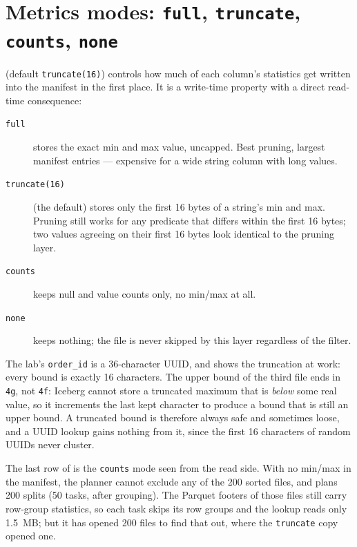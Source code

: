 \section{Metrics modes: \texttt{full}, \texttt{truncate}, \texttt{counts}, \texttt{none}}
\label{sec:ice-read-metrics-modes}

 (default \texttt{truncate(16)})
controls how much of each column's statistics get written into the manifest in
the first place. It is a write-time property with a direct read-time consequence:

\begin{description}
  \item[\texttt{full}] stores the exact min and max value, uncapped. Best
        pruning, largest manifest entries --- expensive for a wide string
        column with long values.
  \item[\texttt{truncate(16)}] (the default) stores only the first 16 bytes of a
        string's min and max. Pruning still works for any predicate that
        differs within the first 16 bytes; two values agreeing on their first 16
        bytes look identical to the pruning layer.
  \item[\texttt{counts}] keeps null and value counts only, no min/max at all.
  \item[\texttt{none}] keeps nothing; the file is never skipped by this layer
        regardless of the filter.
\end{description}

The lab's \texttt{order\_id} is a 36-character UUID, and 
shows the truncation at work: every bound is exactly 16 characters. The upper
bound of the third file ends in \texttt{4g}, not \texttt{4f}: Iceberg cannot store
a truncated maximum that is \emph{below} some real value, so it increments the
last kept character to produce a bound that is still an upper bound. A
truncated bound is therefore always safe and sometimes loose, and a UUID lookup
gains nothing from it, since the first 16 characters of random UUIDs never
cluster.

The last row of  is the \texttt{counts} mode seen from
the read side. With no min/max in the manifest, the planner cannot exclude any of
the 200 sorted files, and plans 200 splits (50 tasks, after grouping). The
Parquet footers of those files still carry row-group statistics, so each task
skips its row groups and the lookup reads only 1.5~MB; but it has opened 200
files to find that out, where the \texttt{truncate} copy opened one.

